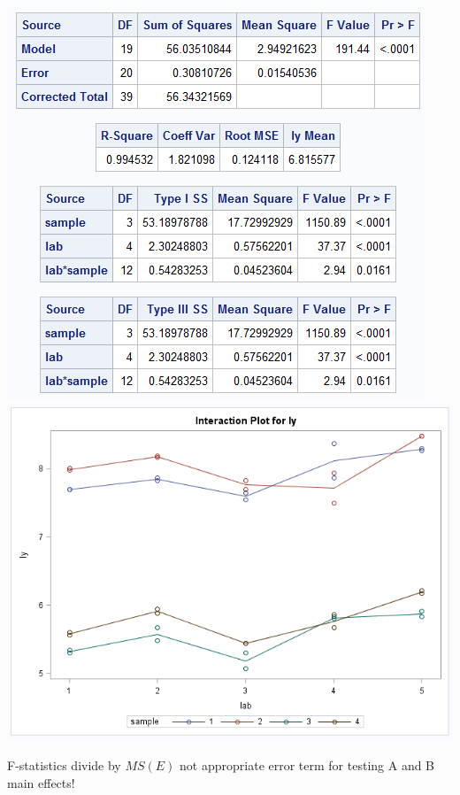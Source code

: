\begin{center}
\includegraphics[scale=0.7]{MilkGLM}\includegraphics[scale=0.5]{MilkGLM2}
\end{center}

F-statistics divide by $MS(E)$ not appropriate error term for testing A and B main effects! \\~\\

